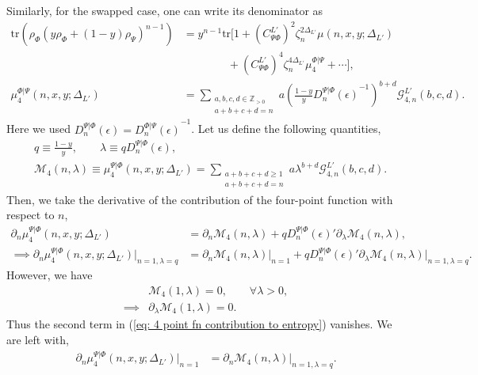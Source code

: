 \documentclass[11pt]{article}
\newcommand{\ep}{\epsilon}
\newcommand{\p}{\partial}
\newcommand{\mO}{\mathcal{O}}
\newcommand{\nn}{\nonumber}
\newcommand{\lb}{\left(}
\newcommand{\rb}{\right)}
\begin{document}
Similarly, for the swapped case, one can write its denominator as
\begin{align}
\text{tr}\lb
\rho_\Phi
\lb y\rho_\Phi+(1-y)\rho_\Psi\rb^{n-1}
\rb
&=
y^{n-1}\text{tr}\Bigg[
1
+{(C_{\Psi\Phi}^{L'})}^2\zeta_n^{2\Delta_{L'}}
\mu(n,x,y;\Delta_{L'})
\nn\\
&\qquad\qquad
+{(C_{\Psi\Phi}^{L'})}^4\zeta_n^{4\Delta_{L'}}
\mu_4^{\Phi|\Psi}
+\cdots
\Bigg],
\\
\mu_4^{\Phi|\Psi}(n,x,y;\Delta_{L'})
&=
\sum_{\substack{
a,b,c,d\in \mathbb{Z}_{>0}\\
a+b+c+d=n
}}
a
\lb
\frac{1-y}{y}
{D_n^{\Psi|\Phi}(\ep)}^{-1}
\rb^{b+d}
\mathcal{G}_{4,n}^{L'}(b,c,d).
\end{align}
Here we used $D_n^{\Psi |\Phi}(\ep) = {D_n^{\Phi |\Psi}(\ep)}^{-1}$. Let us define the following quantities,
\begin{align}
    &q\equiv \frac{1-y}{y}, \qquad \lambda \equiv q D^{\Psi|\Phi}_n(\ep),
\\
&\mathcal{M}_4(n,\lambda)\equiv \mu_4^{\Psi|\Phi}(n,x,y;\Delta_{L'}) = \sum_{\substack{
a+b+c+d\geq 1\\
a+b+c+d=n
}}
a
\lambda^{b+d}
\mathcal{G}_{4,n}^{L'}(b,c,d).
\end{align}
Then, we take the derivative of the contribution of the four-point function with respect to $n$,
\begin{align}
    \p_n \mu_4^{\Psi|\Phi}(n,x,y;\Delta_{L'}) &= \p_n\mathcal{M}_4(n,\lambda) + q{D^{\Psi|\Phi}_n(\ep)}'\p_\lambda \mathcal{M}_4(n,\lambda),\\
    \label{eq: 4 point fn contribution to entropy}\implies \p_n \mu_4^{\Psi|\Phi}(n,x,y;\Delta_{L'})\big|_{n=1,\lambda =q} &= \p_n\mathcal{M}_4(n,\lambda)\big|_{n=1} + q {D^{\Psi|\Phi}_n(\ep)}'\p_\lambda \mathcal{M}_4(n,\lambda)\Big|_{n=1,\lambda =q}.
\end{align}
However, we have
\begin{align}
    &\mathcal{M}_4(1,\lambda) = 0, \qquad \forall \lambda>0,
    \\
    \implies &\p_\lambda \mathcal{M}_4(1,\lambda)=0.
\end{align}
Thus the second term in (\ref{eq: 4 point fn contribution to entropy}) vanishes. 
We are left with,
\begin{align}
    \p_n \mu_4^{\Psi|\Phi}(n,x,y;\Delta_{L'})\big|_{n=1} &= \p_n\mathcal{M}_4(n,\lambda)\big|_{n=1,\lambda = q} .
\end{align}
\end{document}
